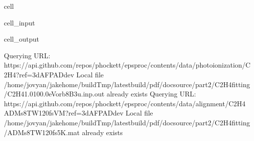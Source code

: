 \documentclass[letterpaper,table,10pt,english]{jupyterBook}
\begin{document}
\begin{sphinxuseclass}{cell}\begin{sphinxVerbatimInput}

\begin{sphinxuseclass}{cell_input}
\begin{sphinxVerbatim}[commandchars=\\\{\}]
   

  
      
      
\end{sphinxVerbatim}

\end{sphinxuseclass}\end{sphinxVerbatimInput}
\begin{sphinxVerbatimOutput}

\begin{sphinxuseclass}{cell_output}
\begin{sphinxVerbatim}[commandchars=\\\{\}]
Querying URL: https://api.github.com/repos/phockett/epsproc/contents/data/photoionization/C2H4?ref=3d\PYGZhy{}AFPAD\PYGZhy{}dev
Local file /home/jovyan/jake\PYGZhy{}home/buildTmp/\PYGZus{}latest\PYGZus{}build/pdf/doc\PYGZhy{}source/part2/C2H4fitting/C2H4\PYGZus{}1.0\PYGZhy{}100.0eV\PYGZus{}orb8\PYGZus{}B3u.inp.out already exists
Querying URL: https://api.github.com/repos/phockett/epsproc/contents/data/alignment/C2H4\PYGZus{}ADMs\PYGZus{}8TW\PYGZus{}120fs\PYGZus{}VM?ref=3d\PYGZhy{}AFPAD\PYGZhy{}dev
Local file /home/jovyan/jake\PYGZhy{}home/buildTmp/\PYGZus{}latest\PYGZus{}build/pdf/doc\PYGZhy{}source/part2/C2H4fitting/ADMs\PYGZus{}8TW\PYGZus{}120fs\PYGZus{}5K.mat already exists
\end{sphinxVerbatim}

\end{sphinxuseclass}\end{sphinxVerbatimOutput}

\end{sphinxuseclass}
\end{document}
